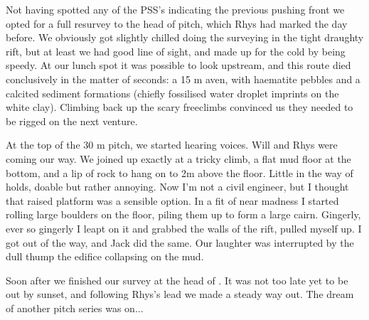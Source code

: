 Not having spotted any of the PSS's indicating the previous pushing front we opted for a full resurvey to the head of  pitch, which Rhys had marked the day before. We obviously got slightly chilled doing the surveying in the tight draughty rift, but at least we had good line of sight, and made up for the cold by being speedy. At our lunch spot it was possible to look upstream, and this route died conclusively in the matter of seconds: a 15 m aven, with haematite pebbles and a calcited sediment formations (chiefly fossilised water droplet imprints on the white clay). Climbing back up the scary freeclimbs convinced us they needed to be rigged on the next venture. 

At the top of the 30 m pitch, we started hearing voices. Will and Rhys were coming our way. We joined up exactly at a tricky climb, a flat mud floor at the bottom, and a lip of rock to hang on to 2m above the floor. Little in the way of holds, doable but rather annoying. Now I'm not a civil engineer, but I thought that raised platform was a sensible option. In a fit of near madness I started rolling large boulders on the floor, piling them up to form a large cairn. Gingerly, ever so gingerly I leapt on it and grabbed the walls of the rift, pulled myself up. I got out of the way, and Jack did the same. Our laughter was interrupted by the dull thump the edifice collapsing on the mud. 

Soon after we finished our survey at the head of . It was not too late yet to be out by sunset, and following Rhys's lead we made a steady way out. The dream of another pitch series was on... 

